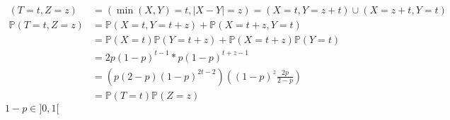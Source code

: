 \documentclass[a4paper,12pt]{book}
\begin{document}
\begin{align*}
    (T=t,Z=z)&=(\min(X,Y)=t,|X-Y|=z)=(X=t,Y=z+t)\cup(X=z+t,Y=t)\\
    \mathbb{P}(T=t,Z=z)&=\mathbb{P}(X=t,Y=t+z)+\mathbb{P}(X=t+z,Y=t)\\
    &=\mathbb{P}(X=t)\mathbb{P}(Y=t+z)+\mathbb{P}(X=t+z)\mathbb{P}(Y=t)\\
    &=2p(1-p)^{t-1}*p(1-p)^{t+z-1}\\
    &=\left(p(2-p)(1-p)^{2t-2}\right)\left((1-p)^z\frac{2p}{2-p}\right)\\
    &=\mathbb{P}(T=t)\mathbb{P}(Z=z)    
\end{align*}
$1-p \in ]0,1[$
\end{document}
